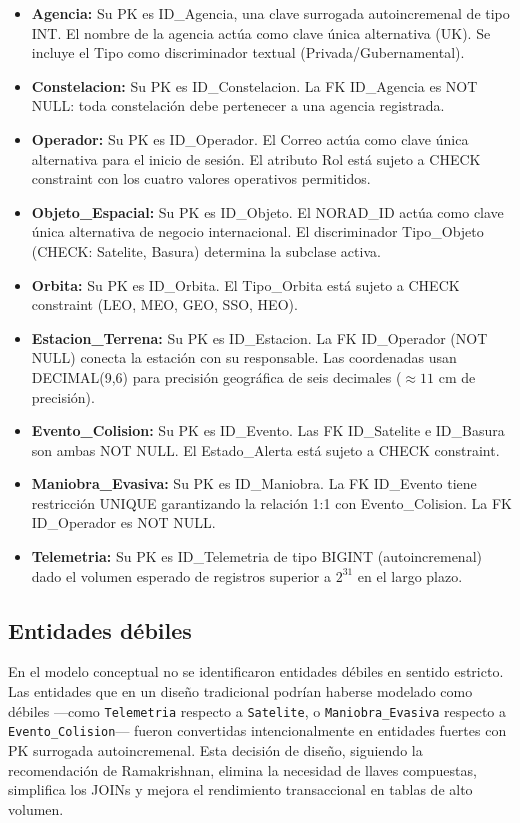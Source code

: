\begin{itemize}
    \item \textbf{Agencia:} Su PK es ID\_Agencia, una clave surrogada autoincremenal de tipo INT. El nombre de la agencia actúa como clave única alternativa (UK). Se incluye el Tipo como discriminador textual (Privada/Gubernamental).
    \item \textbf{Constelacion:} Su PK es ID\_Constelacion. La FK ID\_Agencia es NOT NULL: toda constelación debe pertenecer a una agencia registrada.
    \item \textbf{Operador:} Su PK es ID\_Operador. El Correo actúa como clave única alternativa para el inicio de sesión. El atributo Rol está sujeto a CHECK constraint con los cuatro valores operativos permitidos.
    \item \textbf{Objeto\_Espacial:} Su PK es ID\_Objeto. El NORAD\_ID actúa como clave única alternativa de negocio internacional. El discriminador Tipo\_Objeto (CHECK: Satelite, Basura) determina la subclase activa.
    \item \textbf{Orbita:} Su PK es ID\_Orbita. El Tipo\_Orbita está sujeto a CHECK constraint (LEO, MEO, GEO, SSO, HEO).
    \item \textbf{Estacion\_Terrena:} Su PK es ID\_Estacion. La FK ID\_Operador (NOT NULL) conecta la estación con su responsable. Las coordenadas usan DECIMAL(9,6) para precisión geográfica de seis decimales ($\approx 11$ cm de precisión).
    \item \textbf{Evento\_Colision:} Su PK es ID\_Evento. Las FK ID\_Satelite e ID\_Basura son ambas NOT NULL. El Estado\_Alerta está sujeto a CHECK constraint.
    \item \textbf{Maniobra\_Evasiva:} Su PK es ID\_Maniobra. La FK ID\_Evento tiene restricción UNIQUE garantizando la relación 1:1 con Evento\_Colision. La FK ID\_Operador es NOT NULL.
    \item \textbf{Telemetria:} Su PK es ID\_Telemetria de tipo BIGINT (autoincremenal) dado el volumen esperado de registros superior a $2^{31}$ en el largo plazo.
\end{itemize}

\subsection{Entidades débiles}

En el modelo conceptual no se identificaron entidades débiles en sentido estricto. Las entidades que en un diseño tradicional podrían haberse modelado como débiles —como \texttt{Telemetria} respecto a \texttt{Satelite}, o \texttt{Maniobra\_Evasiva} respecto a \texttt{Evento\_Colision}— fueron convertidas intencionalmente en entidades fuertes con PK surrogada autoincremenal. Esta decisión de diseño, siguiendo la recomendación de Ramakrishnan, elimina la necesidad de llaves compuestas, simplifica los JOINs y mejora el rendimiento transaccional en tablas de alto volumen.

